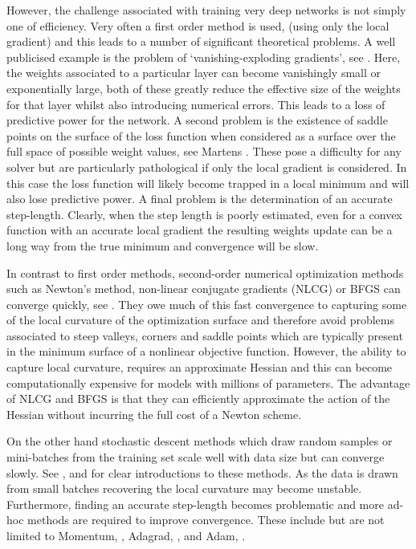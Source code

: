 \documentclass[11pt,twocolumn]{article}
\begin{document}
However, the challenge associated with training very deep networks is not simply one of efficiency. Very often a first order method is used, (using only the local gradient) and this leads to a number of significant theoretical problems. A well publicised example is the problem of `vanishing-exploding gradients', see \cite{Huang:Stoch}. Here, the weights associated to a particular layer can become vanishingly small or exponentially large, both of these greatly reduce the effective size of the weights for that layer whilst also introducing numerical errors. This leads to a loss of predictive power for the network. A second problem is the existence of saddle points on the surface of the loss function when considered as a surface over the full space of possible weight values, see Martens \cite{Martens:Deep} . These pose a difficulty for any solver but are particularly pathological if only the local gradient is considered. In this case the loss function will likely become trapped in a local minimum and will also lose predictive power. A final problem is the determination of an accurate step-length. Clearly, when the step length is poorly estimated, even for a convex function with an accurate local gradient the resulting weights update can be a long way from the true minimum and convergence will be slow.  
   
In contrast to first order methods, second-order numerical optimization methods such as Newton's method, non-linear conjugate gradients (NLCG) or BFGS can converge quickly, see  \cite{Nocedal:Wright}. They owe much of this fast convergence to capturing some of the local curvature of the optimization surface and therefore avoid problems associated to steep valleys, corners and saddle points which are typically present in the minimum surface of a nonlinear objective function. However, the ability to capture local curvature, requires an approximate Hessian and this can become computationally expensive for models with millions of parameters. The advantage of NLCG and BFGS is that they can efficiently approximate the action of the Hessian without incurring the full cost of a Newton scheme.

On the other hand stochastic descent methods which draw random samples or mini-batches from the training set scale well with data size but can converge slowly. See \cite{Goodfellow-et-al-2016}, \cite{Hinton:SGD} and \cite{Ruder:Overview} for clear introductions to these methods. As the data is drawn from small batches recovering the local curvature may become unstable. Furthermore, finding an accurate step-length becomes problematic and more ad-hoc methods are required to improve convergence. These include but are not limited to Momentum, \cite{Momentum:Qian}, Adagrad, \cite{adagrad:Duchi}, and Adam, \cite{adam:Kingma}.
\end{document}
